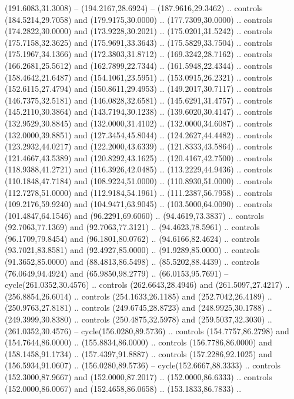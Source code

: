   (191.6083,31.3008) -- (194.2167,28.6924) -- (187.9616,29.3462) .. controls
  (184.5214,29.7058) and (179.9175,30.0000) .. (177.7309,30.0000) .. controls
  (174.2822,30.0000) and (173.9228,30.2021) .. (175.0201,31.5242) .. controls
  (175.7158,32.3625) and (175.9691,33.3643) .. (175.5829,33.7504) .. controls
  (175.1967,34.1366) and (172.3803,31.8712) .. (169.3242,28.7162) .. controls
  (166.2681,25.5612) and (162.7899,22.7344) .. (161.5948,22.4344) .. controls
  (158.4642,21.6487) and (154.1061,23.5951) .. (153.0915,26.2321) .. controls
  (152.6115,27.4794) and (150.8611,29.4953) .. (149.2017,30.7117) .. controls
  (146.7375,32.5181) and (146.0828,32.6581) .. (145.6291,31.4757) .. controls
  (145.2110,30.3864) and (143.7194,30.1238) .. (139.6020,30.4147) .. controls
  (132.9529,30.8845) and (132.0000,31.4102) .. (132.0000,34.6087) .. controls
  (132.0000,39.8851) and (127.3454,45.8044) .. (124.2627,44.4482) .. controls
  (123.2932,44.0217) and (122.2000,43.6339) .. (121.8333,43.5864) .. controls
  (121.4667,43.5389) and (120.8292,43.1625) .. (120.4167,42.7500) .. controls
  (118.9388,41.2721) and (116.3926,42.0485) .. (113.2229,44.9436) .. controls
  (110.1848,47.7184) and (108.9224,51.0000) .. (110.8930,51.0000) .. controls
  (112.7278,51.0000) and (112.9184,54.1961) .. (111.2387,56.7958) .. controls
  (109.2176,59.9240) and (104.9471,63.9045) .. (103.5000,64.0090) .. controls
  (101.4847,64.1546) and (96.2291,69.6060) .. (94.4619,73.3837) .. controls
  (92.7063,77.1369) and (92.7063,77.3121) .. (94.4623,78.5961) .. controls
  (96.1709,79.8454) and (96.1801,80.0762) .. (94.6166,82.4624) .. controls
  (93.7021,83.8581) and (92.4927,85.0000) .. (91.9289,85.0000) .. controls
  (91.3652,85.0000) and (88.4813,86.5498) .. (85.5202,88.4439) .. controls
  (76.0649,94.4924) and (65.9850,98.2779) .. (66.0153,95.7691) --
  cycle(261.0352,30.4576) .. controls (262.6643,28.4946) and (261.5097,27.4217)
  .. (256.8854,26.6014) .. controls (254.1633,26.1185) and (252.7042,26.4189) ..
  (250.9763,27.8181) .. controls (249.6745,28.8723) and (248.9925,30.1788) ..
  (249.3999,30.8380) .. controls (250.4875,32.5978) and (259.5037,32.3030) ..
  (261.0352,30.4576) -- cycle(156.0280,89.5736) .. controls (154.7757,86.2798)
  and (154.7644,86.0000) .. (155.8834,86.0000) .. controls (156.7786,86.0000)
  and (158.1458,91.1734) .. (157.4397,91.8887) .. controls (157.2286,92.1025)
  and (156.5934,91.0607) .. (156.0280,89.5736) -- cycle(152.6667,88.3333) ..
  controls (152.3000,87.9667) and (152.0000,87.2017) .. (152.0000,86.6333) ..
  controls (152.0000,86.0067) and (152.4658,86.0658) .. (153.1833,86.7833) ..
